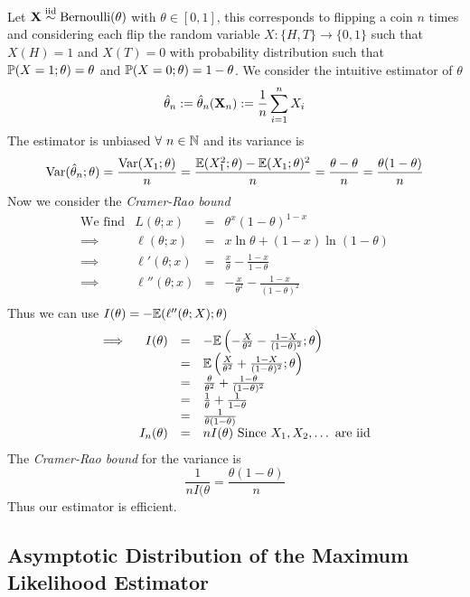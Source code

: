 \documentclass[11pt,a4paper]{article}
\begin{document}
Let $\textbf{X}\overset{\text{iid}}{\sim}\text{Bernoulli}(\theta)$ with $\theta\in[0,1]$, this corresponds to flipping a coin $n$ times and considering each flip the random variable $X:\{H,T\}\to\{0,1\}$ such that $X(H)=1$ and $X(T)=0$ with probability distribution such that $\mathbb{P}(X=1;\theta)=\theta$ and $\mathbb{P}(X=0;\theta)=1-\theta$. We consider the intuitive estimator of $\theta$
$$\hat{\theta}_n:=\hat{\theta}_n(\textbf{X}_n):=\frac{1}{n}\sum_{i=1}^nX_i$$
The estimator is unbiased $\forall\ n\in\nats$ and its variance is
$$\mathrm{Var}(\hat{\theta}_n;\theta)=\frac{\mathrm{Var}(X_1;\theta)}{n}=\frac{\mathbb{E}(X_1^2;\theta)-\mathbb{E}(X_1;\theta)^2}{n}=\frac{\theta-\theta}{n}=\frac{\theta(1-\theta)}{n}$$
Now we consider the \textit{Cramer-Rao bound}
\[\begin{array}{rrcl}
\text{We find}&L(\theta;x)&=&\theta^x(1-\theta)^{1-x}\\
\implies&\ell(\theta;x)&=&x\ln\theta+(1-x)\ln(1-\theta)\\
\implies&\ell'(\theta;x)&=&\frac{x}{\theta}-\frac{1-x}{1-\theta}\\
\implies&\ell''(\theta;x)&=&-\frac{x}{\theta^2}-\frac{1-x}{(1-\theta)^2}\\
\end{array}\]
Thus we can use $I(\theta)=-\mathbb{E}(\ell''(\theta;X);\theta)$
\[\begin{array}{rrcl}
\implies&I(\theta)&=&-\mathbb{E}\left(-\frac{X}{\theta^2}-\frac{1-X}{(1-\theta)^2};\theta\right)\\
&&=&\mathbb{E}\left(\frac{X}{\theta^2}+\frac{1-X}{(1-\theta)^2};\theta\right)\\
&&=&\frac{\theta}{\theta^2}+\frac{1-\theta}{(1-\theta)^2}\\
&&=&\frac{1}{\theta}+\frac{1}{1-\theta}\\
&&=&\frac{1}{\theta(1-\theta)}\\
&I_n(\theta)&=&nI(\theta)\text{ Since $X_1,X_2,\dots$ are iid}\\
\end{array}\]
The \textit{Cramer-Rao bound} for the variance is
$$\frac{1}{nI(\theta}=\frac{\theta(1-\theta)}{n}$$
Thus our estimator is efficient.

\subsection{Asymptotic Distribution of the Maximum Likelihood Estimator}
\end{document}
